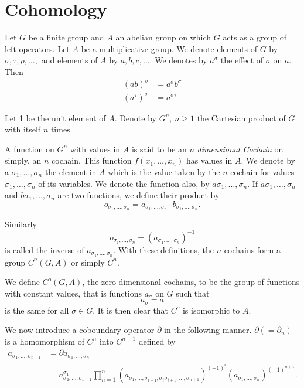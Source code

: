 \section{Cohomology}\label{c6:s3}%

Let $G$ be a finite group and $A$ an abelian group on which $G$ acts
as a group of left operators. Let $A$ be a multiplicative group. We
denote elements of $G$ by $\sigma, \tau, \rho ,\ldots,$ and elements
of $A$ by $a,b,c,\ldots$. We denotes by $a^\sigma$ the effect
of $\sigma$ on $a$. Then   
\begin{align*}
(ab)^\sigma & = a^\sigma b^\sigma\\
(a^\tau)^\sigma & = a^{\sigma \tau}
\end{align*}\pageoriginale

Let 1 be the unit element of $A$. Denote by $G^n$, $n \geq 1$ the
Cartesian product of $G$ with itself $n$ times. 

A function on $G^n$ with values in $A$ is said to be an $n$
\textit{dimensional Cochain} or, simply, an $n$ cochain. This function
$f(x_1,\ldots,x_n)$ has values in $A$. We denote by a $\sigma
_1,\ldots,\sigma_n$ the element in $A$ which is the value taken by the
$n$ cochain for values $\sigma_1,\ldots,\sigma_n$ of its variables. We
denote the function also, by  $a \sigma_1,\ldots,\sigma_n$. If $a
\sigma_1,\ldots,\sigma_n$ and $b \sigma_1,\ldots,\sigma_n$ are two
functions, we define their product by  
$$
o_{\sigma_1,\ldots,\sigma_n} = a_{\sigma_1,\ldots,\sigma_n} \cdot
b_{\sigma_1,\ldots,\sigma_n}.  
$$

Similarly
$$
o_{\sigma_1,\ldots,\sigma_n} = (a_{\sigma_1,\ldots,\sigma_n})^{-1}
$$
is called the inverse of $a_{\sigma_1,\ldots,\sigma_n}$. With these
definitions, the $n$ cochains form a group $C^n(G,A)$ or simply
$C^n$. 

We define $C^o(G,A)$, the zero dimensional cochains, to be the group 
of functions with constant values, that is functions $a_\sigma$ on $G$ 
such that 
$$
a_\sigma = a
$$
is the same for all $\sigma \in G$. It is then clear that $C^o$ is
isomorphic to $A$. 

We now introduce a coboundary operator $\partial$ in the following
manner. $\partial(=\partial_n)$ is a homomorphism of $C^n$ into
$C^{n+1}$ defined by 
\begin{align*}
a_{\sigma_1,\ldots,\sigma_{n+1}} & = \partial a_{\sigma_1,\ldots,
  \sigma_n} \\
& = a^{\sigma_1}_{\sigma_2,\ldots,\sigma_{n+1}}
\prod^n_{n=1} (a_{\sigma_1,\ldots,\sigma_{i-1} ,\sigma_i
  \sigma_{i+1},\ldots,\sigma_{n+1}} )^{(-1)^{i}} 
(a_{\sigma_1,\ldots,\sigma_n})^{(-1)^{n+1}}. 
\end{align*}\pageoriginale

